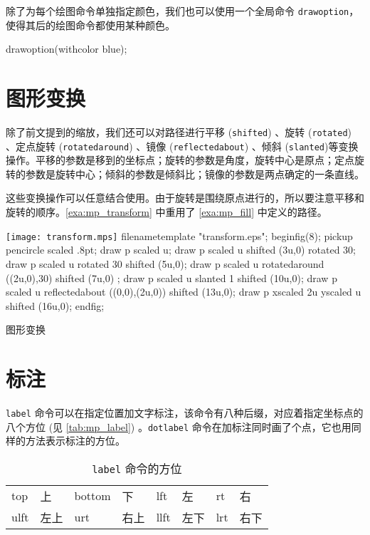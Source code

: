 除了为每个绘图命令单独指定颜色，我们也可以使用一个全局命令 \texttt{drawoption}，使得其后的绘图命令都使用某种颜色。

\begin{Code}[]
drawoption(withcolor blue);
\end{Code}

\section{图形变换}

除了前文提到的缩放，我们还可以对路径进行平移 (\texttt{shifted}) 、旋转 (\texttt{rotated}) 、定点旋转 (\texttt{rotatedaround}) 、镜像 (\texttt{reflectedabout})  、倾斜 (\texttt{slanted})等变换操作。平移的参数是移到的坐标点；旋转的参数是角度，旋转中心是原点；定点旋转的参数是旋转中心；倾斜的参数是倾斜比；镜像的参数是两点确定的一条直线。

这些变换操作可以任意结合使用。由于旋转是围绕原点进行的，所以要注意平移和旋转的顺序。\autoref{exa:mp_transform} 中重用了 \autoref{exa:mp_fill} 中定义的路径。

\begin{example}[h]
\begin{FBTDemo}[numbers=left]{\texttt{[image: transform.mps]}}
filenametemplate "transform.eps";
beginfig(8);
pickup pencircle scaled .8pt;
draw p scaled u;
draw p scaled u shifted (3u,0) rotated 30;
draw p scaled u rotated 30 shifted (5u,0);
draw p scaled u rotatedaround ((2u,0),30) shifted (7u,0) ;
draw p scaled u slanted 1 shifted (10u,0);
draw p scaled u reflectedabout ((0,0),(2u,0)) shifted (13u,0);
draw p xscaled 2u yscaled u shifted (16u,0);
endfig;
\end{FBTDemo}
\caption{\MP 图形变换}
\label{exa:mp_transform}
\end{example}

\section{标注}

 \texttt{label} 命令可以在指定位置加文字标注，该命令有八种后缀，对应着指定坐标点的八个方位 (见 \autoref{tab:mp_label}) 。\texttt{dotlabel} 命令在加标注同时画了个点，它也用同样的方法表示标注的方位。

\begin{table}[htbp]
\centering
\caption{ \texttt{label} 命令的方位}
\label{tab:mp_label}
\begin{tabular}{llllllll}
    \toprule
    top  & 上   & bottom & 下   & lft  & 左   & rt  & 右 \\
    ulft & 左上 & urt    & 右上 & llft & 左下 & lrt & 右下 \\
    \bottomrule
\end{tabular}
\end{table}

